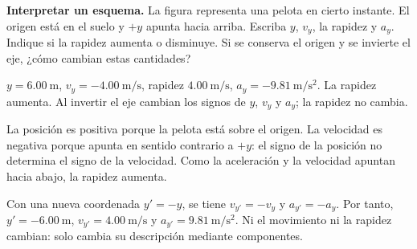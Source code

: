 \begin{ejercicio}
\textbf{Interpretar un esquema.} La figura representa una pelota en cierto instante. El origen está en el suelo y \(+y\) apunta hacia arriba. Escriba \(y\), \(v_y\), la rapidez y \(a_y\). Indique si la rapidez aumenta o disminuye. Si se conserva el origen y se invierte el eje, ¿cómo cambian estas cantidades?
\begin{center}
\end{center}
\end{ejercicio}
\begin{respuesta}
\(y=\SI{6.00}{\meter}\), \(v_y=-\SI{4.00}{\meter\per\second}\), rapidez \(\SI{4.00}{\meter\per\second}\), \(a_y=-\SI{9.81}{\meter\per\second\squared}\). La rapidez aumenta. Al invertir el eje cambian los signos de \(y\), \(v_y\) y \(a_y\); la rapidez no cambia.
\end{respuesta}
\begin{explicacion}
La posición es positiva porque la pelota está sobre el origen. La velocidad es negativa porque apunta en sentido contrario a \(+y\): el signo de la posición no determina el signo de la velocidad. Como la aceleración y la velocidad apuntan hacia abajo, la rapidez aumenta.

Con una nueva coordenada \(y'=-y\), se tiene \(v_{y'}=-v_y\) y \(a_{y'}=-a_y\). Por tanto, \(y'=-\SI{6.00}{\meter}\), \(v_{y'}=\SI{4.00}{\meter\per\second}\) y \(a_{y'}=\SI{9.81}{\meter\per\second\squared}\). Ni el movimiento ni la rapidez cambian: solo cambia su descripción mediante componentes.
\end{explicacion}

